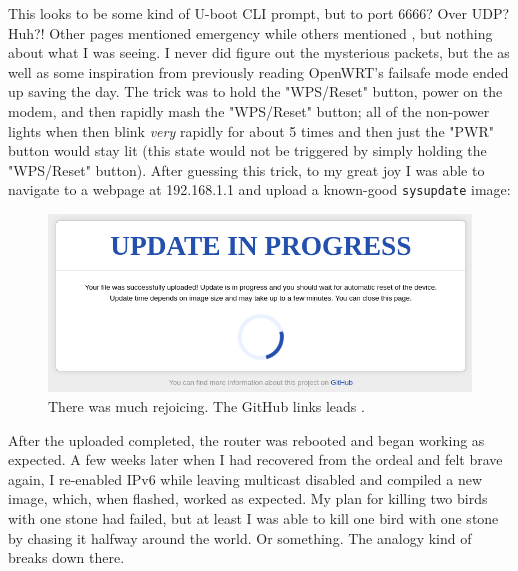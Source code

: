 \documentclass{article}
\begin{document}
This looks to be some kind of U-boot CLI prompt, but to port 6666?  Over UDP?  Huh?!  Other pages mentioned emergency  while others mentioned , but nothing about what I was seeing.  I never did figure out the mysterious packets, but the  as well as some inspiration from previously reading OpenWRT's failsafe mode ended up saving the day.  The trick was to hold the "WPS/Reset" button, power on the modem, and then rapidly mash the "WPS/Reset" button; all of the non-power lights when then blink \emph{very} rapidly for about 5 times and then just the "PWR" button would stay lit (this state would not be triggered by simply holding the "WPS/Reset" button).  After guessing this trick, to my great joy I was able to navigate to a webpage at 192.168.1.1 and upload a known-good \texttt{sysupdate} image:

\begin{figure}
\includegraphics{files/blog/2022_04_03_removing_extra_ip_protocols/2022_04_03_update.png}
\caption{There was much rejoicing.  The GitHub links leads .}
\end{figure}

After the uploaded completed, the router was rebooted and began working as expected.  A few weeks later when I had recovered from the ordeal and felt brave again, I re-enabled IPv6 while leaving multicast disabled and compiled a new image, which, when flashed, worked as expected.  My plan for killing two birds with one stone had failed, but at least I was able to kill one bird with one stone by chasing it halfway around the world.  Or something.  The analogy kind of breaks down there.
\end{document}
